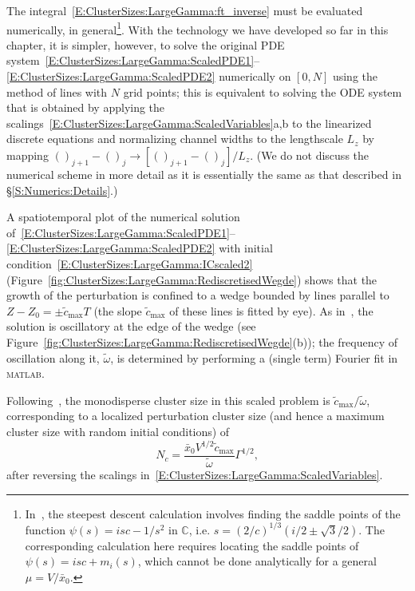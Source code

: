 The integral~\eqref{E:ClusterSizes:LargeGamma:ft_inverse} must be evaluated numerically, in general\footnote{In~\cite{Singh2014JFM}, the steepest descent calculation involves finding the saddle points of the function $\psi(s) = isc - 1/s^2$ in $\mathbb{C}$, i.e. $s = (2/c)^{1/3}(i/2 \pm \sqrt{3}/2)$. The corresponding calculation here requires locating the saddle points of $\psi(s) = isc + m_{i}(s)$, which cannot be done analytically for a general $\mu= V/\bar{x}_0$.}.  With the technology we have developed so far in this chapter, it is simpler, however, to solve the original PDE system~\eqref{E:ClusterSizes:LargeGamma:ScaledPDE1}--\eqref{E:ClusterSizes:LargeGamma:ScaledPDE2} numerically on $\left[0, N\right]$ using the method of lines with $N$ grid points; this is equivalent to solving the ODE system that is obtained by applying the scalings~\eqref{E:ClusterSizes:LargeGamma:ScaledVariables}a,b to the linearized discrete equations and normalizing channel widths to the lengthscale $L_z$ by mapping $()_{j+1} - ()_j \to [()_{j+1} - ()_j]/L_z$. (We do not discuss the numerical scheme in more detail as it is essentially the same as that described in \S\ref{S:Numerics:Details}.)

A spatiotemporal plot of the numerical solution of~\eqref{E:ClusterSizes:LargeGamma:ScaledPDE1}--\eqref{E:ClusterSizes:LargeGamma:ScaledPDE2} with initial condition~\eqref{E:ClusterSizes:LargeGamma:ICscaled2} (Figure~\ref{fig:ClusterSizes:LargeGamma:RediscretisedWegde}) shows  that the growth of the perturbation is confined to a wedge bounded by lines parallel to $Z-Z_0 = \pm \tilde{c}_{\max} T$ (the slope $\tilde{c}_{\max}$ of these lines is fitted by eye). As in~\cite{Singh2014JFM}, the solution is oscillatory at the edge of the wedge (see Figure~\ref{fig:ClusterSizes:LargeGamma:RediscretisedWegde}(b)); the frequency of oscillation along it, $\tilde{\omega}$, is determined by performing a (single term) Fourier fit in \textsc{matlab}.

Following~\cite{Singh2014JFM}, the monodisperse cluster size in this scaled problem is $\tilde{c}_{\max}/\tilde{\omega}$, corresponding to a localized perturbation cluster size (and hence a maximum cluster size with random initial conditions) of
\begin{equation}\label{E:ClusterSizes:LargeGamma:ClusterSize}
N_c = \frac{\bar{x}_0 V^{1/2}\tilde{c}_{\max}}{\tilde{\omega}}\Gamma^{1/2},
\end{equation}
after reversing the scalings in~\eqref{E:ClusterSizes:LargeGamma:ScaledVariables}.

